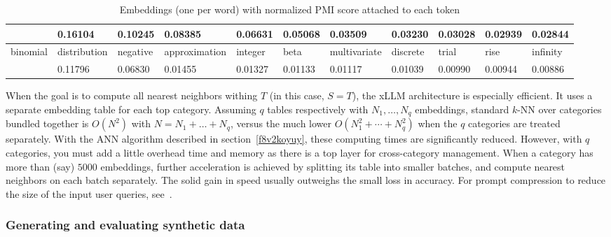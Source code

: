 \documentclass[oneside,10pt]{book}
\begin{document}
\begin{table}[H]
\begin{center}
{\begin{tabular}{l|p{1.7cm}p{1.9cm}p{2.1cm}p{1.7cm}p{1.7cm}p{1.7cm}p{1.7cm}p{1.7cm}p{1.7cm}p{1.3cm}}
	&	0.16104	&	0.10245	&	0.08385	&	0.06631	&	0.05068	&	0.03509	&	0.03230	&	0.03028	&	0.02939	&	0.02844	\\
\hline
binomial	&	distribution	&	negative	&	approximation	&	integer	&	beta	&	multivariate	&	discrete	&	trial	&	rise	&	infinity	\\
	&	0.11796	&	0.06830	&	0.01455	&	0.01327	&	0.01133	&	0.01117	&	0.01039	&	0.00990	&	0.00944	&	0.00886	\\
\hline
\end{tabular}
}
\caption{\label{de2pufd1re} Embeddings (one per word) with normalized PMI score attached to each token}
\end{center}
\end{table}


When the goal is to compute all nearest neighbors 
withing $T$ (in this case, $S=T$), the xLLM architecture is especially efficient.
It uses a separate embedding table for each top category. Assuming $q$ tables respectively with $N_1,\dots,N_q$ embeddings, 
standard $k$-NN  over categories bundled together is 
$O(N^2)$  with $N=N_1+\dots+N_q$, versus the much lower $O(N_1^2+\cdots+N_q^2)$ when the $q$ categories are 
treated separately.
 With the ANN algorithm described in section~\ref{f8v2koyuy}, these computing times are significantly reduced.  
However, with $q$ categories, you must add a little overhead time and memory as there is a top layer for
 cross-category management.  When a category
 has more than (say) $\num{5000}$ embeddings, further acceleration is achieved by splitting its table into
 smaller batches, and compute nearest neighbors on each batch separately. The solid gain in speed
 usually outweighs the small loss in accuracy.  For 
\textcolor{index}{prompt compression} to reduce the size of the input user queries,
 see~\cite{breze24}. 




\subsubsection{Generating and evaluating synthetic data}\label{geasds}
\end{document}
